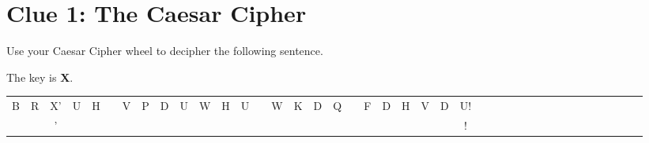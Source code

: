 \documentclass{article}
\begin{document}
\section*{Clue 1: The Caesar Cipher}

Use your Caesar Cipher wheel to decipher the following sentence. 

The key is \textbf{X}.

\vspace{5mm}

\begin{tabular}{*{40}{@{\hskip3pt}c}}
B & R & X' & U & H &   & V & P & D & U & W & H & U &   & W & K & D & Q &   & F & D & H & V & D & U! \\
\underline{\hspace{.5cm}} & \underline{\hspace{.5cm}} & \underline{\hspace{.5cm}}' & \underline{\hspace{.5cm}} & \underline{\hspace{.5cm}} & 
\hspace{.3cm} & 
\underline{\hspace{.5cm}} & \underline{\hspace{.5cm}} & \underline{\hspace{.5cm}} & \underline{\hspace{.5cm}} & \underline{\hspace{.5cm}} & \underline{\hspace{.5cm}} & \underline{\hspace{.5cm}} &
\hspace{.3cm} & 
\underline{\hspace{.5cm}} & \underline{\hspace{.5cm}} & \underline{\hspace{.5cm}} & \underline{\hspace{.5cm}} & 
\hspace{.3cm} & 
\underline{\hspace{.5cm}} & \underline{\hspace{.5cm}} & \underline{\hspace{.5cm}} & \underline{\hspace{.5cm}} & \underline{\hspace{.5cm}} & \underline{\hspace{.5cm}}!

\end{tabular}
 
\vspace{5mm}
\end{document}
